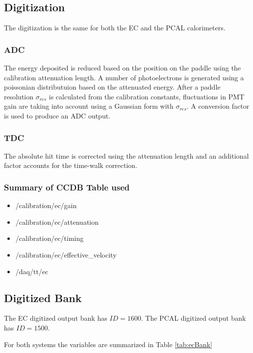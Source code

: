 \subsection{Digitization}
The digitization is the same for both the EC and the PCAL calorimeters.

\subsubsection{ADC}

The energy deposited is reduced based on the position on the paddle using the calibration attenuation length.
A number of photoelectrons is generated using a poissonian distributuion based on the attenuated energy.
After a paddle resolution $\sigma_{res}$ is calculated from the calibration constants, fluctuations in PMT gain
are taking into account using a Gaussian form with $\sigma_{res}$. A conversion factor is used to produce an ADC output.

\subsubsection{TDC}
The absolute hit time is corrected using the attenuation length and an additional factor accounts for the time-walk correction.

\subsubsection{Summary of CCDB Table used}

\begin{itemize}
	\item /calibration/ec/gain
	\item /calibration/ec/attenuation
	\item /calibration/ec/timing
	\item /calibration/ec/effective\_velocity
	\item /daq/tt/ec
\end{itemize}


\subsection{Digitized Bank}
The EC digitized output bank has $ID=1600$.
The PCAL digitized output bank has $ID=1500$.

For both systems the variables are summarized in Table \ref{tab:ecBank}

